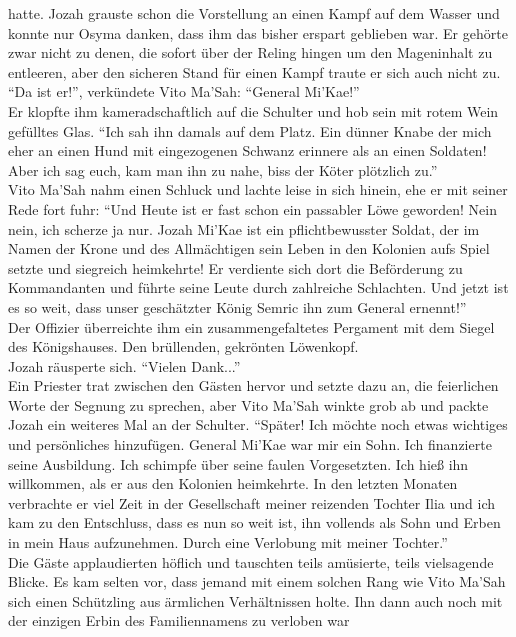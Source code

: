 hatte. Jozah grauste schon die Vorstellung an einen Kampf auf dem Wasser und konnte nur Osyma 
danken, dass ihm das bisher erspart geblieben war. Er gehörte zwar nicht zu denen, die sofort über 
der Reling hingen um den Mageninhalt zu entleeren, aber den sicheren Stand für einen Kampf traute 
er sich auch nicht zu.\\
``Da ist er!'', verkündete Vito Ma'Sah: ``General Mi'Kae!''\\
Er klopfte ihm kameradschaftlich auf die Schulter und hob sein mit rotem Wein gefülltes Glas. ``Ich 
sah ihn damals auf dem Platz. Ein dünner Knabe der mich eher an einen Hund mit eingezogenen Schwanz 
erinnere als an einen Soldaten! Aber ich sag euch, kam man ihn zu nahe, biss der Köter plötzlich 
zu.''\\
Vito Ma'Sah nahm einen Schluck und lachte leise in sich hinein, ehe er mit seiner Rede fort fuhr: 
``Und Heute ist er fast schon ein passabler Löwe geworden! Nein nein, ich scherze ja nur. Jozah 
Mi'Kae ist ein pflichtbewusster Soldat, der im Namen der Krone und des Allmächtigen sein Leben in 
den Kolonien aufs Spiel setzte und siegreich heimkehrte! Er verdiente sich dort die Beförderung zu 
Kommandanten und führte seine Leute durch zahlreiche Schlachten. Und jetzt ist es so weit, dass 
unser geschätzter König Semric ihn zum General ernennt!''\\
Der Offizier überreichte ihm ein zusammengefaltetes Pergament mit dem Siegel des Königshauses. Den 
brüllenden, gekrönten Löwenkopf.\\
Jozah räusperte sich. ``Vielen Dank...''\\
Ein Priester trat zwischen den Gästen hervor und setzte dazu an, die feierlichen Worte der Segnung 
zu sprechen, aber Vito Ma'Sah winkte grob ab und packte Jozah ein weiteres Mal an der Schulter. 
``Später! Ich möchte noch etwas wichtiges und persönliches hinzufügen. General Mi'Kae war mir ein 
Sohn. Ich finanzierte seine Ausbildung. Ich schimpfe über seine faulen Vorgesetzten. Ich hieß ihn 
willkommen, als er aus den Kolonien heimkehrte. In den letzten Monaten verbrachte er viel Zeit in 
der Gesellschaft meiner reizenden Tochter Ilia und ich kam zu den Entschluss, dass es nun so weit 
ist, ihn vollends als Sohn und Erben in mein Haus aufzunehmen. Durch eine Verlobung mit meiner 
Tochter.''\\
Die Gäste applaudierten höflich und tauschten teils amüsierte, teils vielsagende Blicke. Es kam 
selten vor, dass jemand mit einem solchen Rang wie Vito Ma'Sah sich einen Schützling aus ärmlichen 
Verhältnissen holte. Ihn dann auch noch mit der einzigen Erbin des Familiennamens zu verloben war 

